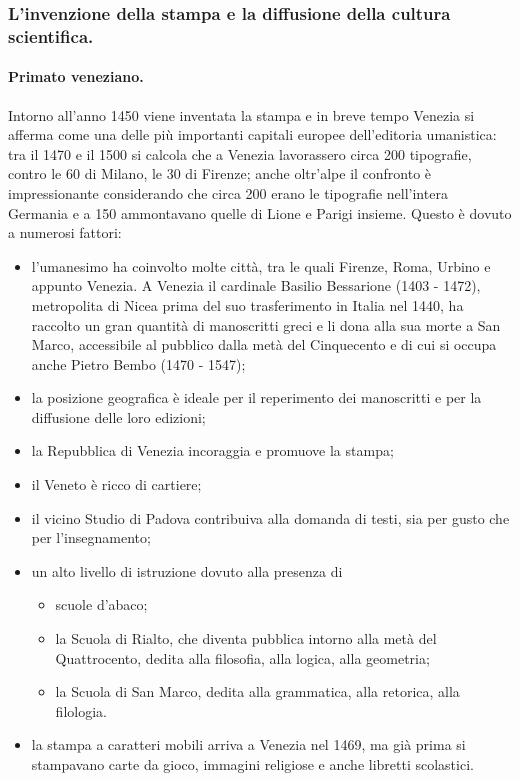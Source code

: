 \subsubsection{L'invenzione della stampa e la diffusione della cultura scientifica.}\label{LInvenzioneDellaStampaELaDiffusioneDellaCulturaScientifica}
\paragraph{Primato veneziano.} Intorno all'anno 1450 viene inventata la stampa e in breve tempo Venezia si afferma come una delle pi\`u importanti capitali europee dell'editoria umanistica: tra il 1470 e il 1500 si calcola che a Venezia lavorassero circa 200 tipografie, contro le 60 di Milano, le 30 di Firenze; anche oltr'alpe il confronto \`e impressionante considerando che circa 200 erano le tipografie nell'intera Germania e a 150 ammontavano quelle di Lione e Parigi insieme. Questo \`e dovuto a numerosi fattori:
\begin{itemize}
	\item l'umanesimo ha coinvolto molte citt\`a, tra le quali Firenze, Roma, Urbino e appunto Venezia. A Venezia il cardinale Basilio Bessarione (1403 - 1472), metropolita di Nicea prima del suo trasferimento in Italia nel 1440, ha raccolto un gran quantit\`a di manoscritti greci e li dona alla sua morte a San Marco, accessibile al pubblico dalla met\`a del Cinquecento e di cui si occupa anche Pietro Bembo (1470 - 1547);
	\item la posizione geografica \`e ideale per il reperimento dei manoscritti e per la diffusione delle loro edizioni;
	\item la Repubblica di Venezia incoraggia e promuove la stampa;
	\item il Veneto \`e ricco di cartiere;
	\item il vicino Studio di Padova contribuiva alla domanda di testi, sia per gusto che per l'insegnamento;
	\item un alto livello di istruzione dovuto alla presenza di
	\begin{itemize}
		\item scuole d'abaco;
		\item la Scuola di Rialto, che diventa pubblica intorno alla met\`a del Quattrocento, dedita alla filosofia, alla logica, alla geometria;
		\item la Scuola di San Marco, dedita alla grammatica, alla retorica, alla filologia.
	\end{itemize}
	\item la stampa a caratteri mobili arriva a Venezia nel 1469, ma gi\`a prima si stampavano carte da gioco, immagini religiose e anche libretti scolastici.
\end{itemize}
